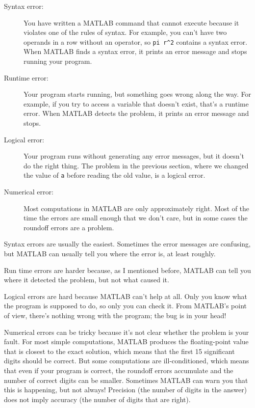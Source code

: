 \documentclass{book}
\begin{document}
\begin{description}

\item[Syntax error:] You have written a MATLAB command that cannot
execute because it violates one of the rules of syntax.  For example,
you can't have two operands in a row without an operator, so 
\verb+pi r^2+ contains a syntax error.  When MATLAB finds a syntax
error, it prints an error message and stops running your program.

\item[Runtime error:] Your program starts running, but something goes
wrong along the way.  For example, if you try to access a variable
that doesn't exist, that's a runtime error.  When MATLAB detects the
problem, it prints an error message and stops.

\item[Logical error:] Your program runs without generating any error
messages, but it doesn't do the right thing.  The problem in the
previous section, where we changed the value of {\tt a} before
reading the old value, is a logical error.

\item[Numerical error:] Most computations in MATLAB are only
approximately right.  Most of the time the errors are small enough
that we don't care, but in some cases the roundoff errors are a problem.

\end{description}

Syntax errors are usually the easiest.  Sometimes the error messages
are confusing, but MATLAB can usually tell you where the error is, at
least roughly.

Run time errors are harder because, as I mentioned before, MATLAB
can tell you where it detected the problem, but not what caused it.

Logical errors are hard because MATLAB can't help at all.  Only you
know what the program is supposed to do, so only you can check it.
From MATLAB's point of view, there's nothing wrong with the program;
the bug is in your head!

Numerical errors can be tricky because it's not clear whether the
problem is your fault.  For most simple computations, MATLAB produces
the floating-point value that is closest to the exact solution, which
means that the first 15 significant digits should be correct.  But some
computations are ill-conditioned, which means that even if your program
is correct, the roundoff errors accumulate and the number of correct
digits can be smaller.  Sometimes MATLAB can warn you that
this is happening, but not always!  Precision (the number of digits
in the answer) does not imply accuracy (the number of digits that
are right).
\end{document}
